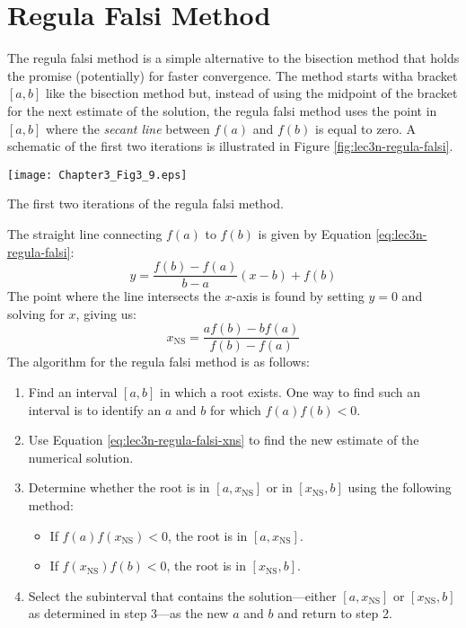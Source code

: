 \section{Regula Falsi Method}
The regula falsi method is a simple alternative to the bisection method that holds the promise (potentially) for faster convergence.  The method starts witha bracket $[a,b]$ like the bisection method but, instead of using the midpoint of the bracket for the next estimate of the solution, the regula falsi method uses the point in $[a,b]$ where the \emph{secant line} between $f(a)$ and $f(b)$ is equal to zero.  A schematic of the first two iterations is illustrated in Figure \ref{fig:lec3n-regula-falsi}.
\begin{marginfigure}
\texttt{[image: Chapter3\_Fig3\_9.eps]}
\caption{The first two iterations of the regula falsi method.}
\label{fig:lec3n-regula-falsi}
\end{marginfigure}
The straight line connecting $f(a)$ to $f(b)$ is given by Equation \ref{eq:lec3n-regula-falsi}:
\begin{equation}
y = \frac{f(b) - f(a)}{b-a}(x-b)+f(b)
\label{eq:lec3n-regula-falsi}
\end{equation}
The point where the line intersects the $x$-axis is found by setting $y=0$ and solving for $x$, giving us:
\begin{equation}
x_{\text{NS}} = \frac{a f(b) - b f(a)}{f(b) - f(a)}
\label{eq:lec3n-regula-falsi-xns}
\end{equation}
The algorithm for the regula falsi method is as follows:
\begin{enumerate}
\item Find an interval $[a,b]$ in which a root exists.  One way to find such an interval is to identify an $a$ and $b$ for which $f(a)f(b)<0$.
\item Use Equation \ref{eq:lec3n-regula-falsi-xns} to find the new estimate of the numerical solution.
\item Determine whether the root is in $[a,x_{\text{NS}}]$ or in $[x_{\text{NS}},b]$ using the following method:
\begin{itemize}
\item If $f(a)f(x_{\text{NS}}) < 0$, the root is in $[a,x_{\text{NS}}]$.
\item If $f(x_{\text{NS}})f(b) < 0$, the root is in $[x_{\text{NS}},b]$.
\end{itemize}
\item Select the subinterval that contains the solution---either $[a,x_{\text{NS}}]$ or $[x_{\text{NS}},b]$ as determined in step 3---as the new $a$ and $b$ and return to step 2.
\end{enumerate}
